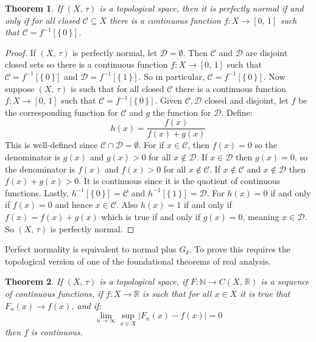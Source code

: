 \documentclass{article}
\theoremstyle{plain}
\newtheorem{theorem}{Theorem}[section]
\theoremstyle{normal}
\begin{document}
        \begin{theorem}
            If $(X,\,\tau)$ is a topological space, then it is perfectly normal
            if and only if for all closed $\mathcal{C}\subseteq{X}$ there is a
            continuous function $f:X\rightarrow[0,\,1]$ such that
            $\mathcal{C}=f^{-1}[\{\,0\,\}]$.
        \end{theorem}
        \begin{proof}
            If $(X,\,\tau)$ is perfectly normal, let $\mathcal{D}=\emptyset$.
            Then $\mathcal{C}$ and $\mathcal{D}$ are disjoint closed sets so
            there is a continuous function $f:X\rightarrow[0,\,1]$ such that
            $\mathcal{C}=f^{-1}[\{\,0\,\}]$ and
            $\mathcal{D}=f^{-1}[\{\,1\,\}]$. So in particular,
            $\mathcal{C}=f^{-1}[\{\,0\,\}]$. Now suppose $(X,\,\tau)$ is such
            that for all closed $\mathcal{C}$ there is a continuous function
            $f:X\rightarrow[0,\,1]$ such that
            $\mathcal{C}=f^{-1}[\{\,0\,\}]$. Given $\mathcal{C},\mathcal{D}$
            closed and disjoint, let $f$ be the corresponding function for
            $\mathcal{C}$ and $g$ the function for $\mathcal{D}$. Define:
            \begin{equation}
                h(x)
                =\frac{f(x)}{f(x)+g(x)}
            \end{equation}
            This is well-defined since $\mathcal{C}\cap\mathcal{D}=\emptyset$.
            For if $x\in\mathcal{C}$, then $f(x)=0$ so
            the denominator is $g(x)$ and $g(x)>0$ for all $x\notin\mathcal{D}$.
            If $x\in\mathcal{D}$ then $g(x)=0$, so the denominator is
            $f(x)$ and $f(x)>0$ for all $x\notin\mathcal{C}$. If
            $x\notin\mathcal{C}$ and $x\notin\mathcal{D}$ then $f(x)+g(x)>0$.
            It is continuous since it is the quotient of continuous functions.
            Lastly, $h^{-1}[\{\,0\,\}]=\mathcal{C}$ and
            $h^{-1}[\{\,1\,\}]=\mathcal{D}$. For $h(x)=0$ if and only if
            $f(x)=0$ and hence $x\in\mathcal{C}$. Also $h(x)=1$ if and only if
            $f(x)=f(x)+g(x)$ which is true if and only if $g(x)=0$, meaning
            $x\in\mathcal{D}$. So $(X,\,\tau)$ is perfectly normal.
        \end{proof}
        Perfect normality is equivalent to normal plus $G_{\delta}$. To prove
        this requires the topological version of one of the foundational
        theorems of real analysis.
        \begin{theorem}
            If $(X,\,\tau)$ is a topological space, if
            $F:\mathbb{N}\rightarrow{C}(X,\,\mathbb{R})$ is a sequence of
            continuous functions, if $f:X\rightarrow\mathbb{R}$ is
            such that for all $x\in{X}$ it is true that
            $F_{n}(x)\rightarrow{f}(x)$, and if:
            \begin{equation}
                \lim_{n\rightarrow\infty}\sup_{x\in{X}}|F_{n}(x)-f(x)|=0
            \end{equation}
            then $f$ is continuous.
        \end{theorem}
\end{document}
